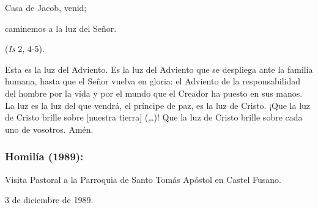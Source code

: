 \begin{body}
	Casa de Jacob, venid;
	
	caminemos a la luz del Señor.
	
	(\emph{Is} 2, 4-5).
	
	Esta es la luz del Adviento. Es la luz del Adviento que se despliega ante la familia humana, hasta que el Señor vuelva en gloria: el Adviento de la responsabilidad del hombre por la vida y por el mundo que el Creador ha puesto en sus manos. La luz es la luz del que vendrá, el príncipe de paz, es la luz de Cristo. ¡Que la luz de Cristo brille sobre {[}nuestra tierra{]} (\ldots{})! Que la luz de Cristo brille sobre cada uno de vosotros. Amén.
\end{body}

\subsubsection{Homilía (1989):} Visita Pastoral a la Parroquia de Santo Tomás Apóstol en Castel Fusano.

3 de diciembre de 1989.

